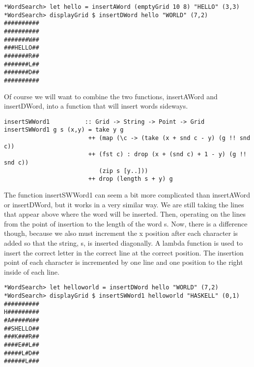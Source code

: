 \documentclass[12pt]{report}   %
\begin{document}
    \vspace{12pt}

    \begin{lstlisting}
*WordSearch> let hello = insertAWord (emptyGrid 10 8) "HELLO" (3,3)
*WordSearch> displayGrid $ insertDWord hello "WORLD" (7,2)
##########
##########
#######W##
###HELLO##
#######R##
#######L##
#######D##
##########
    \end{lstlisting}

    \vspace{12pt}

    Of course we will want to combine the two functions, insertAWord and 
    insertDWord, into a function that will insert words sideways.

    \vspace{12pt}

    \begin{lstlisting}
insertSWWord1          :: Grid -> String -> Point -> Grid
insertSWWord1 g s (x,y) = take y g 
                        ++ (map (\c -> (take (x + snd c - y) (g !! snd c)) 
                        ++ (fst c) : drop (x + (snd c) + 1 - y) (g !! snd c)) 
                           (zip s [y..])) 
                        ++ drop (length s + y) g
    \end{lstlisting}

    \vspace{12pt}

    The function insertSWWord1 can seem a bit more complicated than insertAWord
    or insertDWord, but it works in a very similar way. We are still taking the
    lines that appear above where the word will be inserted. Then, operating on
    the lines from the point of insertion to the length of the word s. Now,
    there is a difference though, because we also must increment the x position
    after each character is added so that the string, s, is inserted
    diagonally. A lambda function is used to insert the correct letter in the
    correct line at the correct position. The insertion point of each character
    is incremented by one line and one position to the right inside of each
    line.

    \vspace{12pt}
    \pagebreak

    \begin{lstlisting}
*WordSearch> let helloworld = insertDWord hello "WORLD" (7,2) 
*WordSearch> displayGrid $ insertSWWord1 helloworld "HASKELL" (0,1)
##########
H#########
#A#####W##
##SHELLO##
###K###R##
####E##L##
#####L#D##
######L###
    \end{lstlisting}
\end{document}
